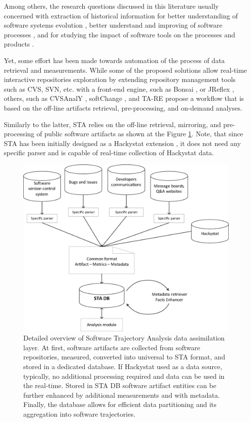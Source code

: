 Among others, the research questions discussed in this literature usually concerned with extraction of historical information 
for better understanding of software systems evolution \cite{citeulike:277045} \cite{citeulike:4000311}, 
better understand and improving of software processes \cite{citeulike:5803126}, 
and for studying the impact of software tools on the processes and products \cite{citeulike:13125389}. 

Yet, some effort has been made towards automation of the process of data retrieval and measurements. 
While some of the proposed solutions allow real-time interactive repositories exploration by extending 
repository management tools such as CVS, SVN, etc. with a front-end engine, such as Bonsai \cite{bonsai},
or JReflex \cite{citeulike:3017440}, others, such as CVSAnalY \cite{citeulike:6544724}, softChange \cite{citeulike:13125395},
and {TA}-{RE} \cite{citeulike:4000311} propose a workflow that is based on the off-line artifacts retrieval, 
pre-processing, and on-demand analyses.

Similarly to the latter, STA relies on the off-line retrieval, mirroring, and pre-processing of public software artifacts as
shown at the Figure \ref{fig:sta-assimilation}. Note, that since STA has been initially designed as a Hackystat extension 
\cite{csdl2-10-09}, it does not need any specific parser and is capable of real-time collection of Hackystat data.

\begin{figure}[t]
   \centering
   \includegraphics[width=115mm]{figures/Flow.eps}
   \caption{Detailed overview of Software Trajectory Analysis data assimilation layer. 
    At first, software artifacts are collected from software repositories, measured, converted into 
    universal to STA format, and stored in a dedicated database.
    If Hackystat used as a data source, typically, no additional processing required and data can be used in the real-time.
    Stored in STA DB software artifact entities can be further enhanced by additional measurements and with metadata.
    Finally, the database allows for efficient data partitioning and its aggregation into software trajectories.}
   \label{fig:sta-assimilation}
\end{figure}

